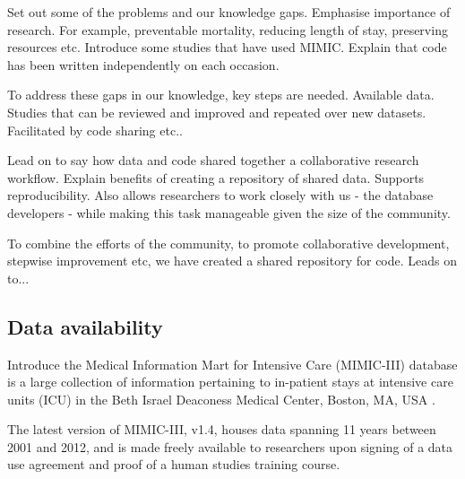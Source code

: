 \documentclass{bioinfo}
\begin{document}


Set out some of the problems and our knowledge gaps. Emphasise importance of research. For example, preventable mortality, reducing length of stay, preserving resources etc. Introduce some studies that have used MIMIC. Explain that code has been written independently on each occasion. 

To address these gaps in our knowledge, key steps are needed. Available data. Studies that can be reviewed and improved and repeated over new datasets. Facilitated by code sharing etc..

Lead on to say how data and code shared together a collaborative research workflow. Explain benefits of creating a repository of shared data. Supports reproducibility.  Also allows researchers to work closely with us - the database developers - while making this task manageable given the size of the community. 

To combine the efforts of the community, to promote collaborative development, stepwise improvement etc, we have created a shared repository for code. Leads on to...


\subsection{Data availability}


Introduce the Medical Information Mart for Intensive Care (MIMIC-III) database is a large collection of information pertaining to in-patient stays at intensive care units (ICU) in the Beth Israel Deaconess Medical Center, Boston, MA, USA \cite{mimiciii}. 



The latest version of MIMIC-III, v1.4, houses data spanning 11 years between 2001 and 2012, and is made freely available to researchers upon signing of a data use agreement and proof of a human studies training course. 
\end{document}
